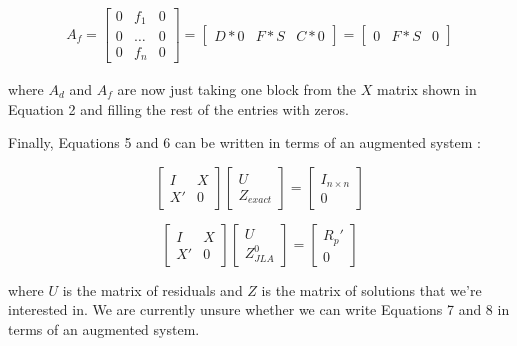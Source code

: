 \documentclass[12pt]{article}
\begin{document}
\begin{align}
    A_f =  \begin{bmatrix}
0 & f_1  & 0\\
0 & \dots & 0\\
0 & f_n  & 0 
\end{bmatrix} =   \begin{bmatrix} D*0 & F*S & C*0 \end{bmatrix} =  \begin{bmatrix} 0 & F*S & 0 \end{bmatrix}
\end{align}

\noindent where $A_d$ and $A_f$ are now just taking one block from the $X$ matrix shown in Equation 2 and filling the rest of the entries with zeros.

\vspace{0.5cm}

\noindent Finally, Equations 5 and 6 can be written in terms of an augmented system :

\begin{equation}
  \begin{bmatrix}
I & X \\
X' & 0  
\end{bmatrix}  \begin{bmatrix} U \\ Z_{exact} \end{bmatrix} = \begin{bmatrix} I_{n\times n} \\ 0 \end{bmatrix}
\label{aug:exact}
\end{equation}


\begin{equation}
  \begin{bmatrix}
I & X \\
X' & 0  
\end{bmatrix}  \begin{bmatrix} U \\ Z_{JLA}^0 \end{bmatrix} = \begin{bmatrix} R_p' \\ 0 \end{bmatrix}
\label{aug:JLA1}
\end{equation}

\noindent where $U$ is the matrix of residuals and $Z$ is the matrix of solutions that we're interested in. We are currently unsure whether we can write Equations 7 and 8 in terms of an augmented system.
\end{document}
